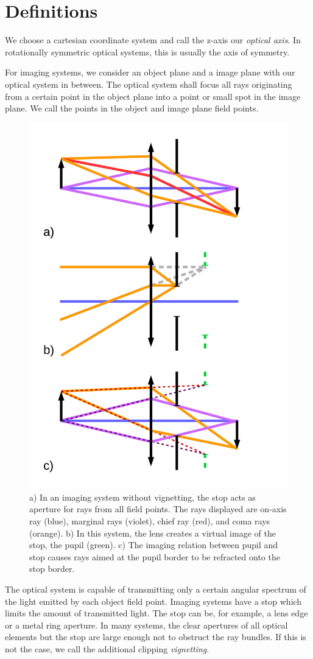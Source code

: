 \documentclass[12pt,a4paper,twoside,openright,BCOR10mm,headsepline,titlepage,abstracton,chapterprefix,final]{scrreprt}
\begin{document}
\section{Definitions}

We choose a cartesian coordinate system and call the z-axis our \emph{optical axis}. 
In rotationally symmetric optical systems, this is usually the axis of symmetry.

For imaging systems, we consider an object plane and a image plane with our optical system in between. 
The optical system shall focus all rays originating from a certain point in the object plane into a point or small spot in the image plane.
We call the points in the object and image plane field points.

\begin{figure}
  \centering
   \includegraphics[width=0.5\columnwidth]{pupil}
  \caption{a) In an imaging system without vignetting, the stop acts as aperture for rays from all field points. The rays displayed are on-axis ray (blue), marginal rays (violet), chief ray (red), and coma rays (orange).
  b) In this system, the lens creates a virtual image of the stop, the pupil (green).
  c) The imaging relation between pupil and stop causes rays aimed at the pupil border to be refracted onto the stop border.
  }
  \label{fig:pupil}
\end{figure}


The optical system is capable of transmitting only a certain angular spectrum of the light emitted by each object field point.
Imaging systems have a stop which limits the amount of transmitted light.
The stop can be, for example, a lens edge or a metal ring aperture.
In many systems, the clear apertures of all optical elements but the stop are large enough not to obstruct the ray bundles.
If this is not the case, we call the additional clipping \emph{vignetting}.
\end{document}
